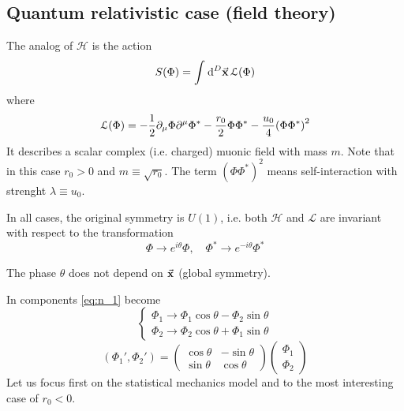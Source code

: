 \documentclass[../main/main.tex]{subfiles}
\begin{document}
\subsection{Quantum relativistic case (field theory)}
The analog of \( \mathcal{H} \) is the action
\begin{equation}
  S(\Phi ) = \int_{}^{} \dd[D]{\va{x}}   \mathcal{L} ( \Phi )
\end{equation}
where
\begin{equation}
  \mathcal{L} (\Phi ) = - \frac{1}{2} \partial_\mu \Phi \partial^\mu \Phi ^*
  - \frac{r_0}{2} \Phi \Phi ^* - \frac{u_0}{4} \qty(\Phi \Phi ^*)^2
\end{equation}
It describes a scalar complex (i.e. charged) muonic field with mass \( m \). Note that in this case \( r_0>0 \) and \( m \equiv \sqrt{r_0}  \). The term \( (\Phi \Phi ^*)^2 \) means self-interaction with strenght \( \lambda \equiv u_0 \).

In all cases, the original symmetry is \( U(1) \), i.e. both \( \mathcal{H} \) and \( \mathcal{L} \) are invariant with respect to the transformation
\begin{equation}
  \Phi \rightarrow e^{i \theta } \Phi , \quad \Phi ^* \rightarrow e^{-i \theta } \Phi ^*
  \label{eq:n_1}
\end{equation}
\begin{remark}
The phase \( \theta  \) does not depend on \( \va{x} \) (global symmetry).
\end{remark}
In components \eqref{eq:n_1} become
\begin{equation}
  \begin{cases}
   \Phi _1 \rightarrow  \Phi _1 \cos \theta - \Phi _2 \sin \theta \\
  \Phi _2 \rightarrow  \Phi _2 \cos \theta + \Phi _1 \sin \theta
  \end{cases}
\end{equation}
\begin{equation}
  (\Phi _1', \Phi _2') = \begin{pmatrix}
  \cos \theta    & - \sin \theta   \\
    \sin \theta  & \cos \theta
  \end{pmatrix}
  \begin{pmatrix}
  \Phi _1 \\
  \Phi _2
  \end{pmatrix}
\end{equation}
Let us focus first on the statistical mechanics model and to the most interesting case of \( r_0 <0 \).
\end{document}
